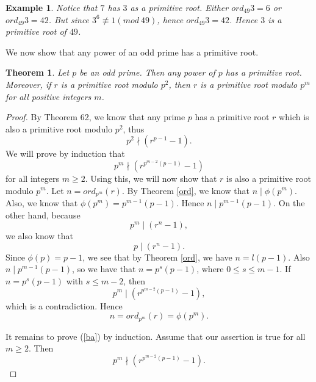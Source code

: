 \documentclass[12pt,letterpaper]{book}
\newtheorem{theorem}{Theorem}
\newtheorem{example}{Example}
\begin{document}
\begin{example}
Notice that $7$ has $3$ as a primitive root. Either $ord_{49}3=6$ or
$ord_{49}3=42$.  But since $3^6\not\equiv 1(mod \ 49)$, hence
$ord_{49}3=42$.  Hence $3$ is a primitive root of $49$.
\end{example}

We now show that any power of an odd prime has a primitive root.

\begin{theorem}\label{Primitive1}
Let $p$ be an odd prime.  Then any power of $p$ has a primitive root.
Moreover, if $r$ is a primitive root modulo $p^2$, then $r$ is a
primitive root modulo $p^m$ for all positive integers $m$.
\end{theorem}

\begin{proof}
By Theorem 62, we know that any prime $p$ has a primitive root $r$
which is also a primitive root modulo $p^2$, thus
\begin{equation}\label{1}
p^2\nmid (r^{p-1}-1).
\end{equation}
We will prove by induction that
\begin{equation}\label{ba}
p^m\nmid (r^{p^{m-2}(p-1)}-1)
\end{equation}
for all integers $m\geq 2$. Using this, we will now
show that $r$ is also a primitive root modulo $p^m$. Let
$n=ord_{p^m}(r)$.  By Theorem \ref{ord}, we know that $n\mid \phi(p^m)$.
Also, we know that $\phi(p^m)=p^{m-1}(p-1)$.  Hence $n\mid p^{m-1}(p-1)$. On
the other hand, because
\begin{equation*}
p^m\mid (r^n- 1),
\end{equation*}
we also know that
\begin{equation*}
p\mid (r^n-1).
\end{equation*}
Since $\phi(p)=p-1$, we see that by Theorem \ref{ord}, we have $n=l(p-1)$.
Also $n\mid p^{m-1}(p-1)$, so we have that $n=p^s(p-1)$, where $0 \leq
s\leq m-1$.  If $n=p^s(p-1)$ with $s\leq m-2$, then
\begin{equation*}
p^m\mid (r^{p^{m-2}(p-1)}-1),
\end{equation*}
which is a contradiction.  Hence
\begin{equation*}
n=ord_{p^m}(r)=\phi(p^m).
\end{equation*}
\par It remains to prove (\ref{ba}) by induction.  Assume that our
assertion is true for all $m\geq 2$.  Then
\begin{equation*}
p^m\nmid (r^{p^{m-2}(p-1)}-1).

\end{equation*}
\end{proof}
\end{document}
